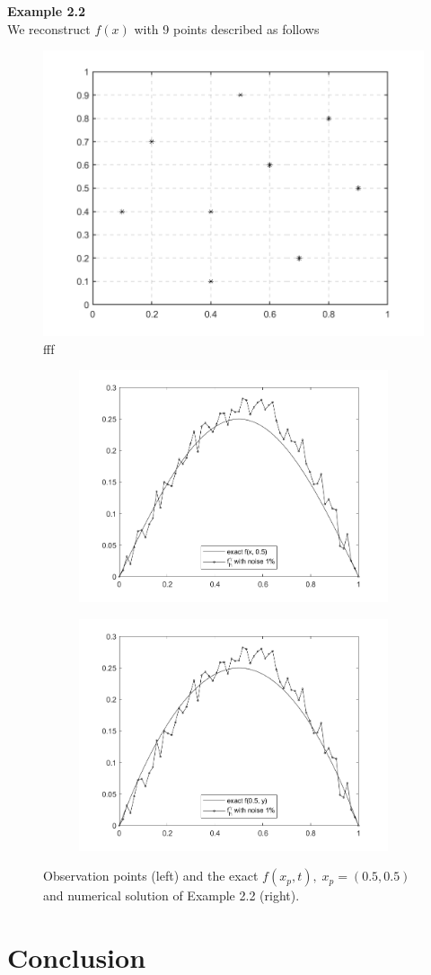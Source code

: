 \documentclass[]{article}
\begin{document}
\newpage
\noindent\textbf{Example 2.2}
\\
We reconstruct $f(x)$ with 9 points described as follows
\begin{figure}[h!]
	\centering
	\includegraphics[width=.5\linewidth]{../Csharp/Results/Nine_Points}
	\caption{fff}
\end{figure}
\begin{figure}[h!]
	\begin{subfigure}{.5\linewidth}
		\centering
		\includegraphics[width=\linewidth]{../Csharp/Results/HS_9Points_fx1}
	\end{subfigure}%
	\begin{subfigure}{.5\linewidth}
		\centering
		\includegraphics[width=\linewidth]{../Csharp/Results/HS_9Points_fx2}
	\end{subfigure}
	\caption{Observation points (left) and the exact $f(x_p, t),\;x_p=(0.5, 0.5)$ and numerical solution of Example 2.2 (right).}
\end{figure}
\justifying
\section{Conclusion}

\newpage
{}

\end{document}

